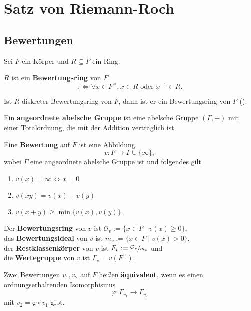 
\chapter{Satz von Riemann-Roch}
\section{Bewertungen}
Sei $F$ ein Körper und $R \subseteq F$ ein Ring.

\begin{definition}
    $R$ ist ein \textbf{Bewertungsring} von $F$
    $$:\iff \forall x  \in F^{\times}: x \in R \text{ oder } x^{-1} \in R.$$
\end{definition}

\begin{beispiel}
    Ist $R$ diskreter Bewertungsring von $F$, dann ist er ein Bewertungsring von $F$ ().
\end{beispiel}

\begin{definition}
    Ein \textbf{angeordnete abelsche Gruppe} ist eine abelsche Gruppe $(\Gamma, +)$ mit einer
    Totalordnung, die mit der Addition verträglich ist.

    Eine \textbf{Bewertung} auf $F$ ist eine Abbildung
    $$ v: F \to \Gamma \cup \{\infty\}, $$
    wobei $\Gamma$ eine angeordnete abelsche Gruppe ist und folgendes gilt
    \begin{enumerate}[label=(\arabic*)]
        \item $v(x) = \infty \iff x = 0$
        \item $v(xy) = v(x) + v(y)$
        \item $v(x+y) \geq \min\{v(x), v(y)\}$.
    \end{enumerate}

    Der \textbf{Bewertungsring} von $v$ ist $\mathcal{O}_v := \{x \in F \mid v(x) \geq 0\}$,\\
    das \textbf{Bewertungsideal} von $v$ ist $m_v := \{x \in F \mid v(x) > 0\}$,\\
    der \textbf{Restklassenkörper} von $v$ ist $F_v := \sfrac{\mathcal{O}_v}{m_v}$ und\\
    die \textbf{Wertegruppe} von $v$ ist $\Gamma_v = v(F^\times)$.

    Zwei Bewertungen $v_1, v_2$ auf $F$ heißen \textbf{äquivalent}, wenn es einen ordnungserhaltenden
    Isomorphismus
    $$ \varphi : \Gamma_{v_1} \to \Gamma_{v_2}$$ mit $v_2 = \varphi \circ v_1$ gibt.
\end{definition}

